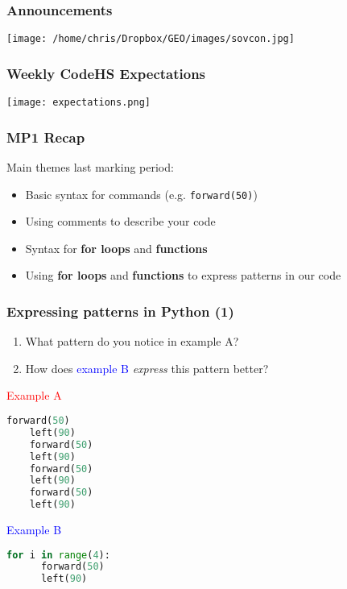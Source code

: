 \begin{frame}
\frametitle<presentation>{Announcements}
\vspace{-1cm}
\hspace{4cm}
\texttt{[image: /home/chris/Dropbox/GEO/images/sovcon.jpg]}
\reminders

\end{frame}

\begin{frame}
\frametitle<presentation>{Weekly CodeHS Expectations}
\texttt{[image: expectations.png]}
\end{frame}


\begin{frame}
\frametitle<presentation>{MP1 Recap}
Main themes last marking period:

\begin{itemize}
	\item<1-> Basic syntax for commands (e.g. \texttt{forward(50)})
	\item Using comments to describe your code
	\item Syntax for \textbf{for loops} and \textbf{functions}
	\item Using \textbf{for loops} and \textbf{functions} to express patterns in our code
\end{itemize}
\end{frame}


\begin{frame}[fragile]
\frametitle<presentation>{Expressing patterns in Python (1)}
\begin{enumerate}
	\item What pattern do you notice in \alert{example A}?
	\item How does \textcolor{blue}{example B} \textit{express} this pattern better?

\end{enumerate}
	

\begin{minipage}[t]{0.45\textwidth}
	\textcolor{red}{Example A}
	\begin{lstlisting}[language=Python]
	forward(50)
	left(90)
	forward(50)
	left(90)
	forward(50)
	left(90)
	forward(50)
	left(90)
	\end{lstlisting}
\end{minipage}
\begin{minipage}[t]{0.45\textwidth}
	\textcolor{blue}{Example B}
	\begin{lstlisting}[language=Python]
	for i in range(4):
	  forward(50)
	  left(90)
	\end{lstlisting}
\end{minipage}

\note{}
\end{frame}

